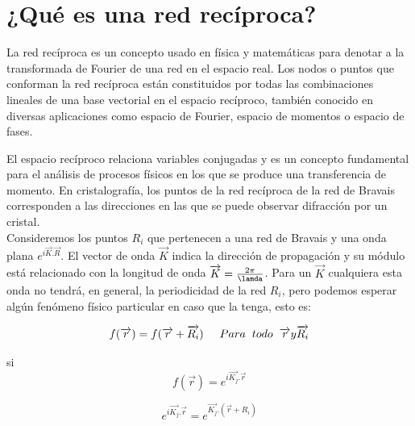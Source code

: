 \documentclass[12pt,a4paper]{article}
\begin{document}
\vspace{0.2cm}

\section{¿Qué es una red recíproca?}

La red recíproca es un concepto usado en física y matemáticas para denotar a la transformada de Fourier de una red en el espacio real. Los nodos o puntos que conforman la red recíproca están constituidos por todas las combinaciones lineales de una base vectorial en el espacio recíproco, también conocido en diversas aplicaciones como espacio de Fourier, espacio de momentos o espacio de fases.

El espacio recíproco relaciona variables conjugadas y es un concepto fundamental para el análisis de procesos físicos en los que se produce una transferencia de momento. En cristalografía, los puntos de la red recíproca de la red de Bravais corresponden a las direcciones en las que se puede observar difracción por un cristal.\\


Consideremos los puntos $R_{i}$ que pertenecen a una red de Bravais y una onda plana $e^{i \overrightarrow{K}.\overrightarrow{R}}$. El vector de onda $\overrightarrow{K}$ indica la dirección de propagación y su módulo está relacionado con la longitud de onda  $ \overrightarrow{K} = \frac{2\pi}{ \lamda}$. Para un $\overrightarrow{K}$ cualquiera esta onda no tendrá, en general, la periodicidad de la red $R_{i}$, pero podemos esperar algún fenómeno físico particular en caso que la tenga, esto es:

\begin{equation*}
    f(\overrightarrow{r}) = f(\overrightarrow{r} + \overrightarrow{R_{i}}) \hspace{0.5 cm} Para\hspace{0.2 cm} todo \hspace{0.2 cm} \overrightarrow{r} y \overrightarrow{R_{i}}
\end{equation*}

si 
\begin{equation*}
    f(\overrightarrow{r}) = e^{i \overrightarrow{K_{j}}. \overrightarrow{r}}
\end{equation*}

\begin{equation*}
    e^{i \overrightarrow{K_{j}}.\overrightarrow{r}} = e^{\overrightarrow{K_{j}}. (\overrightarrow{r}+ R_{i})}
\end{equation*}
\end{document}
